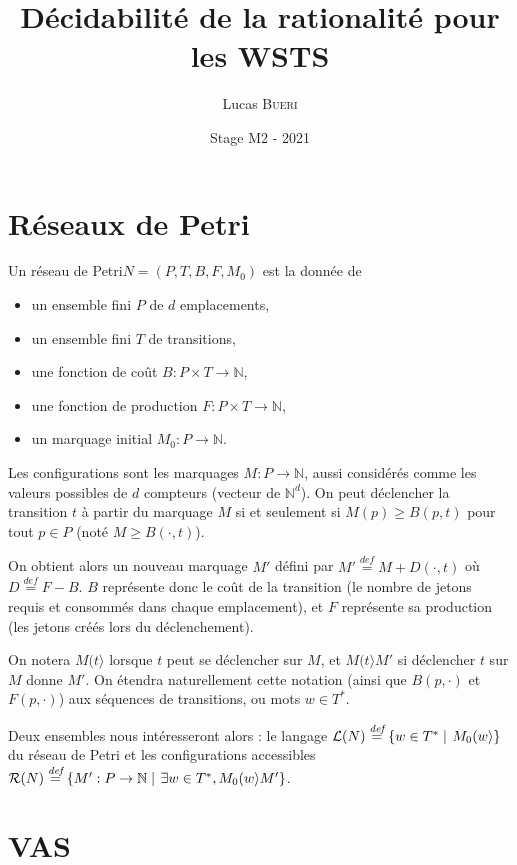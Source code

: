 \documentclass[a4paper,final]{article}
\title{Décidabilité de la rationalité pour les WSTS}
\author{Lucas \textsc{Bueri}}
\date{Stage M2 - 2021}
\theoremstyle{definition}
\let\geq\geqslant
\newcommand{\set}[2]{\left\{#1\mathrel{\left|\vphantom{#1}\vphantom{#2}\right.}#2\right\}}
\newcommand{\defeq}{\ensuremath{\stackrel{\textit{def}}{=}}}
\newcommand{\N}{\ensuremath{\mathbb{N}}}
\newcommand{\petri}{réseau de Petri\xspace}
\newcommand{\fire}[2]{\ensuremath{#1 (#2\rangle}}
\newcommand{\lang}{\ensuremath{\mathcal{L}}}
\newcommand{\reach}{\ensuremath{\mathcal{R}}}
\begin{document}
\maketitle


\section{Réseaux de Petri}

Un \petri $N = (P,T,B,F,M_0)$ est la donnée de
\begin{itemize}
    \item un ensemble fini $P$ de $d$ emplacements,
    \item un ensemble fini $T$ de transitions,
    \item une fonction de coût $B: P\times T\to\N$,
    \item une fonction de production $F: P\times T\to\N$,
    \item un marquage initial $M_0: P\to\N$.
\end{itemize}

Les configurations sont les marquages $M: P\to\N$, aussi considérés comme les valeurs possibles de $d$ compteurs (vecteur de $\N^d$).
On peut déclencher la transition $t$ à partir du marquage $M$ si et
seulement si $M(p)\geq B(p,t)$ pour tout $p\in P$ (noté $M\geq B(\cdot,t)$).

On obtient alors un nouveau marquage $M'$ défini par $M' \defeq M+D(\cdot,t)$ où $D\defeq F-B$. 
$B$ représente donc le coût de la transition (le nombre de jetons requis et consommés dans chaque emplacement), et $F$ représente sa production (les jetons créés lors du déclenchement).

On notera $\fire{M}{t}$ lorsque $t$ peut se déclencher sur $M$, et $\fire{M}{t}M'$ si déclencher $t$ sur $M$ donne $M'$.
On étendra naturellement cette notation (ainsi que $B(p,\cdot)$ et $F(p,\cdot)$) aux séquences de transitions, ou mots $w\in T^\ast$.

Deux ensembles nous intéresseront alors : le langage $\lang(N)\defeq \set{w\in T^\ast} {\fire{M_0}{w}}$ du \petri et les configurations accessibles $\reach(N)\defeq \set{M':P\to\N}{\exists w\in T^\ast, \fire{M_0}{w}M'}$.


\section{VAS}
\end{document}
